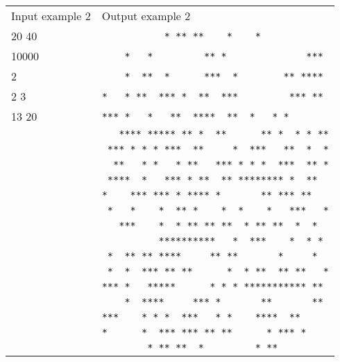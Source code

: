 \documentclass{article}
\begin{document}
\begin{table}[!ht]
    \begin{tabular}{|l|l|}
        \hline
        Input example 2 & Output example 2 \\

        20 40 &\texttt{\ \ \ \ \ \ \ \ \ \ \ *\ **\ **\ \ \ \ *\ \ \ \ *\ \ \ \ \ \ \ \ \ \ \ \ } \\
        10000 &\texttt{\ \ \ \ *\ \ \ *\ \ \ \ \ \ \ \ \ **\ *\ \ \ \ \ \ \ \ \ \ \ \ \ \ ***\ } \\
        2     &\texttt{\ \ \ \ *\ \ **\ \ *\ \ \ \ \ \ ***\ \ *\ \ \ \ \ \ \ \ **\ ****\ } \\
        2 3   &\texttt{*\ \ \ *\ **\ \ ***\ *\ \ **\ \ ***\ \ \ \ \ \ \ \ \ ***\ **\ } \\
        13 20 &\texttt{***\ *\ \ \ *\ \ \ **\ \ ****\ \ **\ \ *\ \ \ *\ *\ \ \ \ \ \ \ } \\
              &\texttt{\ \ \ ****\ *****\ **\ *\ \ **\ \ \ \ \ \ **\ *\ \ *\ *\ **} \\
              &\texttt{\ ***\ *\ *\ *\ ***\ \ **\ \ \ \ \ *\ \ ***\ \ \ **\ \ *\ \ *} \\
              &\texttt{\ \ **\ \ \ *\ *\ \ \ *\ **\ \ \ ***\ *\ *\ *\ \ ***\ \ **\ *} \\
              &\texttt{\ ****\ \ *\ \ \ ***\ *\ **\ \ **\ ********\ *\ \ **\ \ } \\
              &\texttt{*\ \ \ \ ***\ ***\ *\ ****\ *\ \ \ \ \ \ \ **\ ***\ **\ \ \ } \\
              &\texttt{\ *\ \ \ *\ \ \ \ *\ \ **\ *\ \ \ \ *\ \ *\ \ \ \ *\ \ \ ***\ \ \ *} \\
              &\texttt{\ \ \ ***\ \ \ \ *\ \ *\ **\ **\ **\ \ *\ **\ **\ \ *\ \ *\ \ } \\
              &\texttt{\ \ \ \ \ \ \ \ \ \ **********\ \ \ *\ \ ***\ \ \ \ *\ \ *\ *\ } \\
              &\texttt{\ *\ \ **\ **\ ****\ \ \ \ \ **\ **\ \ \ \ \ \ \ *\ \ \ \ \ *\ \ } \\
              &\texttt{\ *\ \ *\ \ ***\ **\ **\ \ \ \ \ \ *\ \ *\ **\ \ **\ **\ \ \ *} \\
              &\texttt{***\ *\ \ \ *****\ \ \ \ \ \ *\ *\ *\ ***********\ **\ } \\
              &\texttt{\ \ \ \ *\ \ ****\ \ \ \ \ ***\ *\ \ \ \ \ \ \ **\ \ \ \ \ \ \ **\ } \\
              &\texttt{***\ \ \ \ *\ *\ *\ \ ***\ \ \ *\ *\ \ \ \ ****\ \ **\ \ \ \ \ } \\
              &\texttt{*\ \ \ \ \ \ *\ \ ***\ ***\ **\ **\ \ \ \ \ \ *\ ***\ *\ \ \ \ } \\
              &\texttt{\ \ \ \ \ \ \ \ *\ **\ **\ \ *\ \ \ \ \ \ \ \ \ *\ **\ \ \ \ \ \ \ \ \ } \\

        \hline
   \end{tabular}
\end{table}
\end{document}

